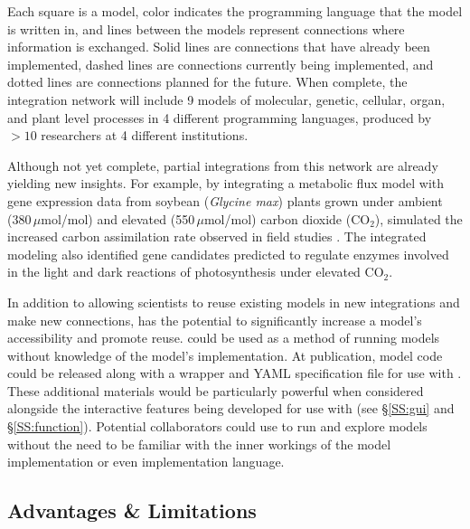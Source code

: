 \documentclass[journal]{IEEEtran}
\newcommand{\todo}[1]{{\color{red}{#1}}}
\newcommand{\pkg}{{\tt \todo{cis\_interface}}{}}
\begin{document}
\fi
%
Each square is a model, color indicates the programming language that the model is written in, and lines between the models represent connections where information is exchanged. Solid lines are connections that have already been implemented, dashed lines are connections currently being implemented, and dotted lines are connections planned for the future. When complete, the integration network will include 9 models of molecular, genetic, cellular, organ, and plant level processes in 4 different programming languages, produced by $>10$ researchers at 4 different institutions. 

Although not yet complete, partial integrations from this network are already yielding new insights. For example, by integrating a metabolic flux model  with gene expression data from soybean (\emph{Glycine max}) plants grown under ambient (380\,$\mu$mol/mol) and elevated (550\,$\mu$mol/mol) carbon dioxide (CO$_2$), 
%
\ifieee
	\citep{integration_prep} 
\else
	\citet{integration_prep} 
\fi
%
simulated the increased carbon assimilation rate observed in field studies \citep{Bernacchi2005}. The integrated modeling also identified gene candidates predicted to regulate enzymes involved in the light and dark reactions of photosynthesis under elevated CO$_2$.

In addition to allowing scientists to reuse existing models in new integrations and make new connections, {\pkg} has the potential to significantly increase a model's accessibility and promote reuse. {\pkg} could be used as a method of running models without knowledge of the model's implementation. At publication, model code could be released along with a wrapper and YAML specification file for use with {\pkg}. These additional materials would be particularly powerful when considered alongside the interactive features being developed for use with {\pkg} (see \S\ref{SS:gui} and \S\ref{SS:function}). Potential collaborators could use {\pkg} to run and explore models without the need to be familiar with the inner workings of the model implementation or even implementation language.

%
\subsection{Advantages \& Limitations}\label{SS:uses}
%
\end{document}
